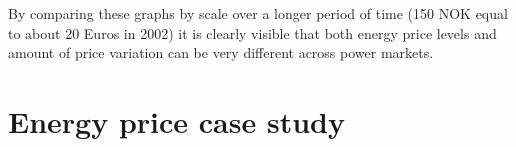By comparing these graphs by scale over a longer period of time (150 NOK equal to about 20 Euros in 2002) it is clearly visible that both energy price levels and amount of price variation can be very different across power markets. 




%
%
%
%


\section{Energy price case study}

%


